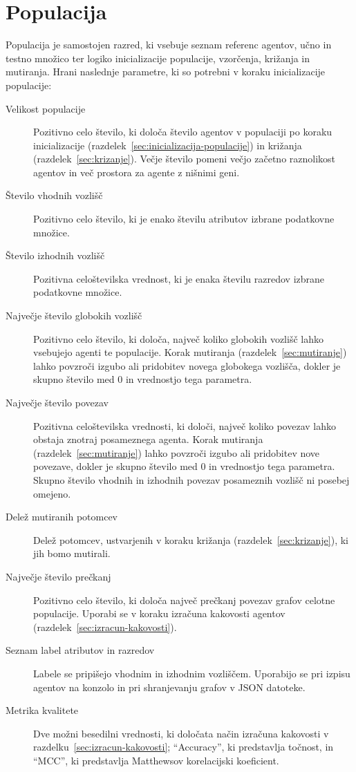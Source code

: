 \documentclass[a4paper,12pt,openright]{book}
\begin{document}
    \section{Populacija}\label{sec:populacija}
    Populacija je samostojen razred, ki vsebuje seznam referenc agentov, učno in testno množico ter logiko inicializacije populacije, vzorčenja,
    križanja in mutiranja.
    Hrani naslednje parametre, ki so potrebni v koraku inicializacije populacije:
    \begin{description}
        \item[Velikost populacije]{Pozitivno celo število, ki določa število agentov v populaciji po koraku inicializacije
            (razdelek~\ref{sec:inicializacija-populacije}) in križanja (razdelek~\ref{sec:krizanje}). Večje število pomeni večjo začetno raznolikost
        agentov in več prostora za agente z nišnimi geni. }
        \item[Število vhodnih vozlišč]{Pozitivno celo število, ki je enako šte\-vi\-lu atributov izbrane podatkovne množice.}
        \item[Število izhodnih vozlišč]{Pozitivna celoštevilska vrednost, ki je enaka šte\-vi\-lu razredov izbrane podatkovne množice.}
        \item[Največje število globokih vozlišč]{Pozitivno celo število, ki do\-lo\-ča, naj\-več koliko globokih vozlišč lahko vsebujejo
        agenti te populacije. Korak mutiranja (razdelek~\ref{sec:mutiranje}) lahko povzroči izgubo ali pridobitev novega globokega
        vozlišča, dokler je skupno število med 0 in vrednostjo tega parametra.}
        \item[Največje število povezav]{Pozitivna celoštevilska vrednosti, ki določi, naj\-več koliko povezav lahko obstaja
        znotraj posameznega agenta. Korak mutiranja (razdelek~\ref{sec:mutiranje}) lahko povzroči izgubo ali pridobitev nove povezave,
        dokler je skupno število med 0 in vrednostjo tega parametra. Skupno število vhodnih in izhodnih povezav posameznih vozlišč ni posebej omejeno. }
        \item[Delež mutiranih potomcev]{Delež potomcev, ustvarjenih v koraku kri\-žan\-ja (razdelek~\ref{sec:krizanje}), ki jih bomo
        mutirali.}
        \item[Največje število prečkanj]{Pozitivno celo število, ki določa naj\-več preč\-kanj povezav grafov
        celotne populacije. Uporabi se v koraku izračuna kakovosti agentov (razdelek~\ref{sec:izracun-kakovosti}).}
        \item[Seznam label atributov in razredov]{Labele se pripišejo vhodnim in izhodnim vozliščem. Uporabijo se pri izpisu
        agentov na konzolo in pri shranjevanju grafov v JSON datoteke. }
        \item[Metrika kvalitete]{Dve možni besedilni vrednosti, ki določata način izra\-ču\-na kakovosti v razdelku~\ref{sec:izracun-kakovosti};
        \enquote{Accuracy}, ki predstavlja točnost, in \enquote{MCC}, ki predstavlja Matthewsov korelacijski koeficient.}
    \end{description}
\end{document}
